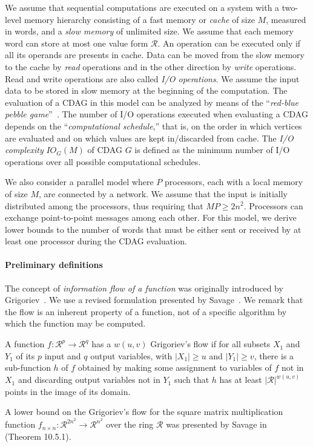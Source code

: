 \documentclass[a4paper,UKenglish]{lipics-v2016}
\newcommand{\ri}{\mathcal{R}}
\newcommand{\io }{I/O }
\begin{document}
We assume that sequential computations are executed on a system with a
two-level memory hierarchy consisting of a fast memory or \emph{cache}
of size $M$, measured in words, and a \emph{slow memory} of
unlimited size. We assume that each memory word can store at most one
value form $\ri$. An operation can be executed only if all its
operands are presents in cache. Data can be moved from the slow memory
to the cache by \emph{read} operations and in the other direction
by \emph{write} operations. Read and write operations are also called
\emph{\io operations}. We assume the input data to be stored in slow
memory at the beginning of the computation. The evaluation of a CDAG in this model can be analyzed by means of the ``\emph{red-blue
  pebble game}''~\cite{jia1981complexity}. The number of \io
operations executed when evaluating a CDAG depends on the
``\emph{computational schedule},'' that is, on the order in which
vertices are evaluated and on which values are kept in/discarded from
cache.  The \emph{\io complexity} $IO_{G}(M)$ of CDAG $G$ is defined
as the minimum number of \io operations over all possible
computational schedules.

We also consider a parallel model where $P$ processors, each with
a local memory of size $M$, are connected by a network. We assume that
the input is initially distributed among the processors, thus
requiring that $MP\geq 2n^2$. Processors can exchange point-to-point
messages among each other. For this model, we derive lower bounds to
the number of words that must be either sent or received by at least
one processor during the CDAG evaluation.

\paragraph*{Preliminary definitions}
The concept of \emph{information flow of a function} was originally
introduced by Grigoriev~\cite{grigor1976application}. We use a revised
formulation presented by Savage~\cite{savage97models}. We remark that
the flow is an inherent property of a function, not of a specific
algorithm by which the function may be computed.
\begin{definition}
A function $f:\mathcal{\ri}^p\rightarrow\mathcal{\ri}^q$ has a $w\left(u, v\right)$ Grigoriev's flow if for all subsets $X_1$ and $Y_1$ of its $p$ input and $q$ output variables, with $|X_1| \geq u$ and $|Y_1| \geq  v$, there is a sub-function $h$ of $f$ obtained by making some assignment to variables of $f$ not in $X_1$  and discarding output variables not in $Y_1$ such that $h$ has at least $|\ri|^{w(u,v)}$ points in the image of its domain. 	
\end{definition}
A lower bound on the Grigoriev's flow for the square matrix multiplication function $f_{n \times n}: \ri^{2n^2} \rightarrow \ri^{n^2}$ over the ring $\ri$ was presented by Savage in~\cite{savage97models} (Theorem 10.5.1). 
 
\end{document}
